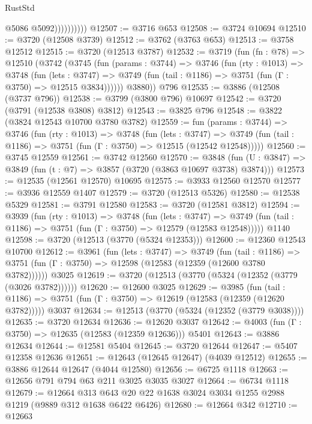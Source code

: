 \begin{lexlean}{RustStd}
\begin{coremodule}
                        @5086
                        @5092))))))))))
@12507 := @3716 @653
@12508 := @3724 @10694
@12510 := @3720 (@12508 @3739)
@12512 := @3762 (@3763 @653)
@12513 := @3758 @12512
@12515 := @3720 (@12513 @3787)
@12532 := @3719
    (fun (fn : @78) =>
    @12510
      (@3742
        (@3745
          (fun (params : @3744) =>
          @3746
            (fun (rty : @1013) =>
            @3748
              (fun (lets : @3747) =>
              @3749 (fun (tail : @1186) => @3751 (fun (Γ : @3750) => @12515 @3834))))))
        @3880))
    @796
@12535 := @3886 (@12508 (@3737 @796))
@12538 := @3799 (@3800 @796) @10697
@12542 := @3720 (@3791 (@12538 @3808) @3812)
@12543 := @3825 @796
@12548 := @3822 (@3824 @12543 @10700 @3780 @3782)
@12559 := fun (params : @3744) =>
  @3746
    (fun (rty : @1013) =>
    @3748
      (fun (lets : @3747) =>
      @3749 (fun (tail : @1186) => @3751 (fun (Γ : @3750) => @12515 (@12542 @12548)))))
@12560 := @3745 @12559
@12561 := @3742 @12560
@12570 := @3848
    (fun (U : @3847) => @3849 (fun (t : @7) => @3857 (@3720 (@3863 @10697 @3738) @3874)))
@12573 := @12535 (@12561 @12570) @10695
@12575 := @3933 @12560 @12570
@12577 := @3936 @12559 @1407
@12579 := @3720 (@12513 @5326)
@12580 := @12538 @5329
@12581 := @3791 @12580
@12583 := @3720 (@12581 @3812)
@12594 := @3939
    (fun (rty : @1013) =>
    @3748
      (fun (lets : @3747) =>
      @3749 (fun (tail : @1186) => @3751 (fun (Γ : @3750) => @12579 (@12583 @12548)))))
    @1140
@12598 := @3720 (@12513 (@3770 (@5324 @12353)))
@12600 := @12360 @12543 @10700
@12612 := @3961
    (fun (lets : @3747) =>
    @3749
      (fun (tail : @1186) =>
      @3751 (fun (Γ : @3750) => @12598 (@12583 (@12359 (@12600 @3780 @3782))))))
    @3025
@12619 := @3720 (@12513 (@3770 (@5324 (@12352 (@3779 (@3026 @3782))))))
@12620 := @12600 @3025
@12629 := @3985
    (fun (tail : @1186) => @3751 (fun (Γ : @3750) => @12619 (@12583 (@12359 (@12620 @3782)))))
    @3037
@12634 := @12513 (@3770 (@5324 (@12352 (@3779 @3038))))
@12635 := @3720 @12634
@12636 := @12620 @3037
@12642 := @4003 (fun (Γ : @3750) => @12635 (@12583 (@12359 @12636))) @5401
@12643 := @3886 @12634
@12644 := @12581 @5404
@12645 := @3720 @12644
@12647 := @5407 @12358 @12636
@12651 := @12643 (@12645 @12647) (@4039 @12512)
@12655 := @3886 @12644 @12647 (@4044 @12580)
@12656 := @6725 @1118
@12663 := @12656 @791 @794 @63 @211 @3025 @3035 @3027
@12664 := @6734 @1118
@12679 := @12664
    @313
    @643
    @20
    @22
    @1638
    @3024
    @3034
    @1255
    @2988
    @1219
    (@9889 @312 @1638 @6422 @6426)
@12680 := @12664 @342
@12710 := @12663

\end{coremodule}
\end{lexlean}
